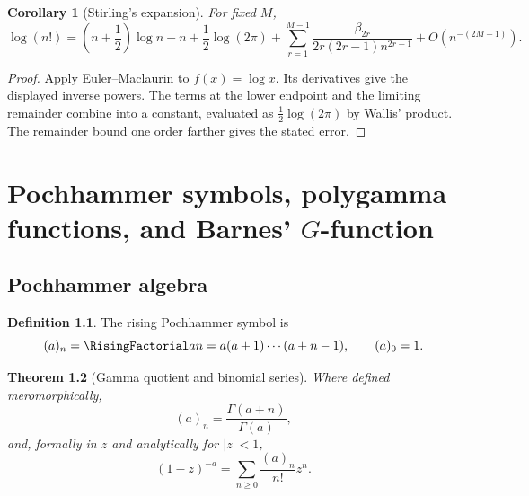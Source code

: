 \documentclass[11pt,a4paper,oneside,openany]{book}
\newtheorem{theorem}{Theorem}[chapter]
\newtheorem{corollary}[theorem]{Corollary}
\theoremstyle{definition}
\newtheorem{definition}[theorem]{Definition}
\theoremstyle{remark}
\begin{document}
\begin{corollary}[Stirling's expansion]
For fixed $M$,
\begin{equation}
 \log(n!)=\left(n+\frac12\right)\log n-n+\frac12\log(2\pi)
 +\sum_{r=1}^{M-1}\frac{\beta_{2r}}{2r(2r-1)n^{2r-1}}
 +O(n^{-(2M-1)}).                                                    \label{eq:merged-stirling-em}
\end{equation}
\end{corollary}

\begin{proof}
Apply Euler--Maclaurin to $f(x)=\log x$.  Its derivatives give the displayed
inverse powers.  The terms at the lower endpoint and the limiting remainder
combine into a constant, evaluated as $\frac12\log(2\pi)$ by Wallis' product.
The remainder bound one order farther gives the stated error.
\end{proof}

\chapter{Pochhammer symbols, polygamma functions, and Barnes' \texorpdfstring{$G$}{G}-function}
\label{ch:merged-gamma-barnes}

\section{Pochhammer algebra}

\begin{definition}
The rising Pochhammer symbol is
\begin{equation}
 (a)_n=\RisingFactorial an=a(a+1)\cdots(a+n-1),\qquad(a)_0=1.                \label{eq:merged-pochhammer}
\end{equation}
\end{definition}

\begin{theorem}[Gamma quotient and binomial series]
\label{thm:merged-pochhammer}
Where defined meromorphically,
\begin{equation}
 (a)_n=\frac{\Gamma(a+n)}{\Gamma(a)},                               \label{eq:merged-pochhammer-gamma}
\end{equation}
and, formally in $z$ and analytically for $|z|<1$,
\begin{equation}
 (1-z)^{-a}=\sum_{n\geq0}\frac{(a)_n}{n!}z^n.                      \label{eq:merged-binomial-series}
\end{equation}
\end{theorem}
\end{document}
